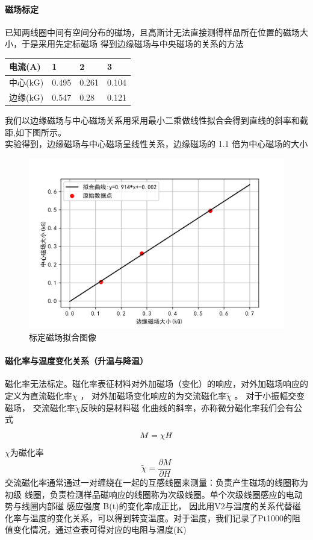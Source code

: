 \documentclass{ctexart}
\theoremstyle{ansstyle}
\begin{document}
\paragraph[short]{磁场标定}  已知两线圈中间有空间分布的磁场，且高斯计无法直接测得样品所在位置的磁场大小，于是采用先定标磁场
得到边缘磁场与中央磁场的关系的方法
\begin{table}[H]
    \centering
    \begin{tabular}{@{}llll@{}}
        \toprule
        电流(A)  & 1     & 2     & 3     \\ \midrule
        中心(kG) & 0.495 & 0.261 & 0.104 \\
        边缘(kG) & 0.547 & 0.28  & 0.121 \\ \bottomrule
    \end{tabular}
\end{table}
我们以边缘磁场与中心磁场关系用采用最小二乘做线性拟合会得到直线的斜率和截距,如下图所示。
\\
实验得到，边缘磁场与中心磁场呈线性关系，边缘磁场的 1.1 倍为中心磁场的大小
\begin{figure}[H]
    \centering
    \caption{标定磁场拟合图像}

    \includegraphics[width=0.75\linewidth]{./png/q1.png}
\end{figure}
\paragraph{磁化率与温度变化关系（升温与降温）} 磁化率无法标定。磁化率表征材料对外加磁场（变化）的响应，对外加磁场响应的定义为直流磁化率$ \chi $ ，
对外加磁场变化响应的为交流磁化率$ \widetilde{\chi}  $ 。 对于小振幅交变磁场， 交流磁化率$ \widetilde{\chi}  $反映的是材料磁
化曲线的斜率，亦称微分磁化率我们会有公式
\begin{equation}
    \centering
    M=\chi H
\end{equation}
$ \chi $为磁化率
\begin{equation}
    \widetilde{\chi} =\frac{\partial M}{\partial H}
\end{equation}
交流磁化率通常通过一对缠绕在一起的互感线圈来测量：负责产生磁场的线圈称为初级
线圈，负责检测样品磁响应的线圈称为次级线圈。单个次级线圈感应的电动势与线圈内部磁
感应强度 B(t)的变化率成正比，
因此用V2与温度的关系代替磁化率与温度的变化关系，可以得到转变温度。对于温度，我们记录了Pt1000的阻值变化情况，通过查表可得对应的电阻与温度(K)\\
\end{document}
